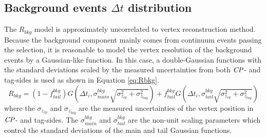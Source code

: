\subsection{Background events $\Delta t$ distribution}
The $R_{bkg}$ model is approximately uncorrelated to vertex reconstruction method. Because the background component mainly comes from continuum events passing the selection, it is reasonable to model the vertex resolution of the background events by a Gaussian-like function. In this case, a double-Gaussian functions with the standard deviations scaled by the measured uncertainties from both $\it{CP}$- and tag-sides is used as shown in Equation \ref{eq:Rbkg}. 
\begin{equation}\label{eq:Rbkg}
R_{bkg} = (1-f^{bkg}_{tail})G(\Delta t_i, \sigma^{bkg}_{main}\sqrt{\sigma^2_{z_{cp}}+\sigma^2_{z_{tag}}})
+ f^{bkg}_{tail}G(\Delta t_i, \sigma^{bkg}_{tail}\sqrt{\sigma^2_{z_{cp}}+\sigma^2_{z_{tag}}})
\end{equation}
where the $\sigma_{z_{cp}}$ and $\sigma_{z_{tag}}$ are the measured uncertainties of the vertex position in $\it{CP}$- and tag-sides. The $\sigma_{main}^{bkg}$ and $\sigma_{tail}^{bkg}$ are the non-unit scaling parameters which control the standard deviations of the main and tail Gaussian functions.

